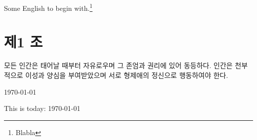 \documentclass{article}
\begin{document}
\begin{center}
	\abstractname
\end{center}
\begin{english}
Some English to begin with.\footnote{ %
	Blabla}
\end{english}

\section{제1 조}

모든 인간은 태어날 때부터 자유로우며 그 존엄과 권리에 있어 동등하다. 인간은 천부적으로 이성과 양심을 부여받았으며 서로 형제애의 정신으로 행동하여야 한다.

\today

\begin{english}
This is today: \today
\end{english}

\end{document}
